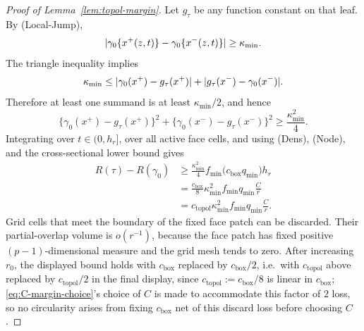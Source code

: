 \documentclass[11pt]{article}
\theoremstyle{plain}
\theoremstyle{definition}
\theoremstyle{remark}
\DeclarePairedDelimiter{\abs}{\lvert}{\rvert}
\begin{document}
\begin{proof}[Proof of Lemma~\ref{lem:topol-margin}]
Let \(g_\tau\) be any function constant on that leaf.  By (Local-Jump),
\[
  \abs{\gamma_0\{x^+(z,t)\}
       -\gamma_0\{x^-(z,t)\}}
  \ge\kappa_{\min}.
\]
The triangle inequality implies
\[
  \kappa_{\min}
  \le
  \abs{\gamma_0(x^+)-g_\tau(x^+)}
  +
  \abs{g_\tau(x^-)-\gamma_0(x^-)}.
\]
Therefore at least one summand is at least \(\kappa_{\min}/2\), and hence
\[
  \{\gamma_0(x^+)-g_\tau(x^+)\}^2
  +
  \{\gamma_0(x^-)-g_\tau(x^-)\}^2
  \ge \frac{\kappa_{\min}^2}{4}.
\]
Integrating over \(t\in(0,h_r]\), over all active face cells, and using
(Dens), (Node), and the cross-sectional lower bound gives
\begin{align*}
  R(\tau)-R(\gamma_0)
  &\ge
  \frac{\kappa_{\min}^2}{4}
  f_{\min}
  \bigl(c_{\mathrm{box}}q_{\min}\bigr)h_r\\
  &=
  \frac{c_{\mathrm{box}}}{8}
  \kappa_{\min}^2f_{\min}q_{\min}\frac{C}{r}\\
  &=
  c_{\mathrm{topol}}\kappa_{\min}^2f_{\min}q_{\min}\frac{C}{r}.
\end{align*}
Grid cells that meet the boundary of the fixed face patch can be discarded.
Their partial-overlap volume is \(o(r^{-1})\), because the face patch has
fixed positive \((p-1)\)-dimensional measure and the grid mesh tends to zero.
After increasing \(r_0\), the displayed bound holds with \(c_{\mathrm{box}}\)
replaced by \(c_{\mathrm{box}}/2\), i.e.\ with \(c_{\mathrm{topol}}\) above
replaced by \(c_{\mathrm{topol}}/2\) in the final display, since
\(c_{\mathrm{topol}}:=c_{\mathrm{box}}/8\) is linear in \(c_{\mathrm{box}}\);
\eqref{eq:C-margin-choice}'s choice of \(C\) is made to accommodate this
factor of \(2\) loss, so no circularity arises from fixing \(c_{\mathrm{box}}\) net of
this discard loss before choosing \(C\).


\end{proof}
\end{document}
